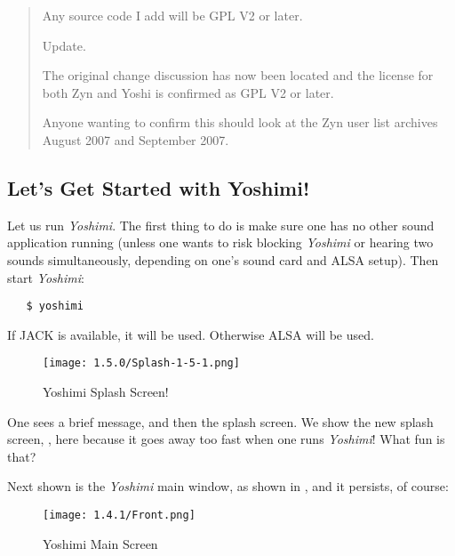 \documentclass[
 11pt,
 twoside,
 a4paper,
 final                                 %
]{article}
\begin{document}
\begin{quotation}
      Any source code I add will be GPL V2 or later.

      Update.

      The original change discussion has now been located and the license for
      both Zyn and Yoshi is confirmed as GPL V2 or later.

      Anyone wanting to confirm this should look at the Zyn user list archives
      August 2007 and September 2007.
   \end{quotation}

\subsection{Let's Get Started with Yoshimi!}
\label{subsec:introduction_lets_get_started}

   Let us run \textsl{Yoshimi}.
   The first
   thing to do is make sure one has no other sound application running
   (unless one wants to risk blocking \textsl{Yoshimi} or hearing two sounds
   simultaneously, depending on one's sound card and ALSA setup).
   Then start \textsl{Yoshimi}:

\begin{verbatim}
   $ yoshimi
\end{verbatim}

   If JACK is available, it will be used.  Otherwise ALSA will be used.

\begin{figure}[H]
   \centering
   \texttt{[image: 1.5.0/Splash-1-5-1.png]}
   \caption{Yoshimi Splash Screen!}
   \label{fig:yoshimi_splash_screen}
\end{figure}

   One sees a brief message, and then the splash screen.
   We show the new splash screen, ,
   here because it goes away too fast when one runs \textsl{Yoshimi}!
   What fun is that?

   Next shown is the \textsl{Yoshimi} main window,
   as shown in ,
   and it persists, of course:

\begin{figure}[H]
   \centering
   \texttt{[image: 1.4.1/Front.png]}
   \caption{Yoshimi Main Screen}
   \label{fig:yoshimi_main_screen}
\end{figure}
\end{document}
